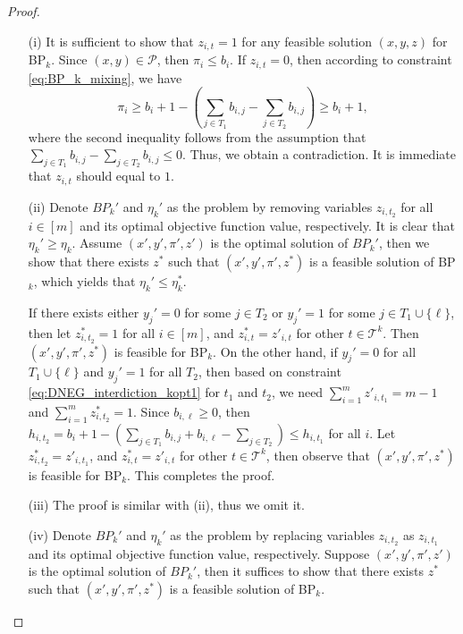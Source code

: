 \documentclass[11pt]{article}
\newcommand{\T}{\mathcal{T}}
\newcommand{\Pp}{\mathcal{P}}
\begin{document}
\begin{proof}
	\begin{itemize}
		\item[(i)] It is sufficient to show that $z_{i,t} = 1$ for any feasible solution $(x, y, z)$ for BP$_k$.  Since $(x, y) \in \Pp$, then $\pi_i \leq b_i$. If $z_{i,t} = 0$, then according to constraint \eqref{eq:BP_k_mixing}, we have 
		\[\pi_i \geq b_i + 1 - (\sum_{j\in T_1}b_{i,j} - \sum_{j\in T_2} b_{i, j}) \geq b_i + 1, \]
		where the second inequality follows from the assumption that $\sum_{j\in T_1} b_{i,j}  - \sum_{j\in T_2} b_{i,j} \leq 0$. Thus, we obtain a contradiction. It is immediate that $z_{i,t}$ should equal to $1$.
		
		\item[(ii)] Denote $BP_k'$ and $\eta_k'$ as the problem by removing variables $z_{i, t_2}$ for all $i\in [m]$ and its optimal objective function value, respectively. It is clear that $\eta_k' \geq \eta_k$. Assume $(x', y', \pi', z')$ is the optimal solution of $BP_k'$, then we show that there exists $z^*$ such that $(x', y', \pi', z^*)$ is a feasible solution of BP$_k$, which yields that $\eta_k'\leq \eta_k^*$.
		
		If there exists either $y_j'=0$ for some $j\in T_2$ or $y_j'=1$ for some $j\in T_1\cup \{\ell\}$, then let $z_{i,t_2}^*=1$ for all $i\in [m]$, and $z^*_{i,t} = z'_{i,t}$ for other $t\in \T^k$. Then  $(x', y', \pi', z^*)$ is feasible for BP$_k$. On the other hand, if $y_j'=0$ for all $T_1\cup \{\ell\}$ and $y_j'=1$ for all $T_2$, then based on constraint \eqref{eq:DNEG_interdiction_kopt1} for $t_1$ and $t_2$, we need $\sum_{i=1}^m z'_{i, t_1} = m-1$ and $\sum_{i=1}^m z^*_{i,t_2}=1$. Since $b_{i,\ell} \geq 0$, then $h_{i, t_2} = b_i + 1 - (\sum_{j\in T_1} b_{i, j} + b_{i, \ell} - \sum_{j\in T_2}) \leq h_{i, t_1}$ for all $i$. Let $z_{i,t_2}^* = z'_{i, t_1}$, and $z^*_{i,t} = z'_{i,t}$ for other $t\in \T^k$, then observe that  $(x', y', \pi', z^*)$ is feasible for BP$_k$. This completes the proof.
		\item[(iii)] The proof is similar with (ii), thus we omit it.
		\item[(iv)] Denote $BP_k'$ and $\eta_k'$ as the problem by replacing variables $z_{i, t_2}$ as $z_{i, t_1}$ and its optimal objective function value, respectively. Suppose $(x', y', \pi', z')$ is the optimal solution of $BP_k'$, then it suffices to show that there exists $z^*$ such that $(x', y', \pi', z^*)$ is a feasible solution of BP$_k$.
		

\end{itemize}
\end{proof}
\end{document}
